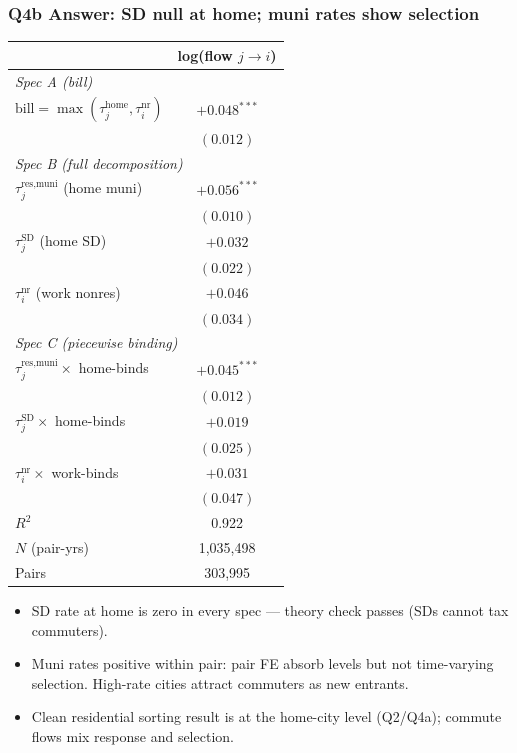 \documentclass[xcolor = x11names, compress, aspectratio = 169]{beamer}
\renewcommand{\(}{\begin{columns}}
\renewcommand{\)}{\end{columns}}
\newcommand{\<}[1]{\begin{column}{#1}}
\renewcommand{\>}{\end{column}}
\begin{document}
\begin{frame}
\frametitle{Q4b Answer: SD null at home; muni rates show selection}
    \centering
    \small
    \begin{tabular}{lc}
        \toprule
        & log(flow $j \to i$) \\
        \midrule
        \multicolumn{2}{l}{\textit{Spec A (bill)}} \\
        $\text{bill} = \max(\tau^{\text{home}}_j, \tau^{\text{nr}}_i)$ & $+0.048^{***}$ \\
                                                                       & $(0.012)$ \\
        \multicolumn{2}{l}{\textit{Spec B (full decomposition)}} \\
        $\tau^{\text{res,muni}}_j$ (home muni)  & $+0.056^{***}$ \\
                                                 & $(0.010)$ \\
        $\tau^{\text{SD}}_j$ (home SD)           & $+0.032$ \\
                                                 & $(0.022)$ \\
        $\tau^{\text{nr}}_i$ (work nonres)       & $+0.046$ \\
                                                 & $(0.034)$ \\
        \multicolumn{2}{l}{\textit{Spec C (piecewise binding)}} \\
        $\tau^{\text{res,muni}}_j \times $ home-binds & $+0.045^{***}$ \\
                                                       & $(0.012)$ \\
        $\tau^{\text{SD}}_j \times $ home-binds        & $+0.019$ \\
                                                       & $(0.025)$ \\
        $\tau^{\text{nr}}_i \times $ work-binds       & $+0.031$ \\
                                                       & $(0.047)$ \\
        \midrule
        $R^2$ & 0.922 \\
        $N$ (pair-yrs) & 1{,}035{,}498 \\
        Pairs           & 303{,}995 \\
        \bottomrule
    \end{tabular}
    \vspace{0.05cm}
    \begin{itemize}\setlength{\itemsep}{0.04cm}\footnotesize
        \item SD rate at home is zero in every spec --- theory check
        passes (SDs cannot tax commuters).
        \item Muni rates positive within pair: pair FE absorb levels
        but not time-varying selection. High-rate cities attract
        commuters as new entrants.
        \item Clean residential sorting result is at the home-city
        level (Q2/Q4a); commute flows mix response and selection.
    \end{itemize}
\end{frame}
\fi %
\end{document}
